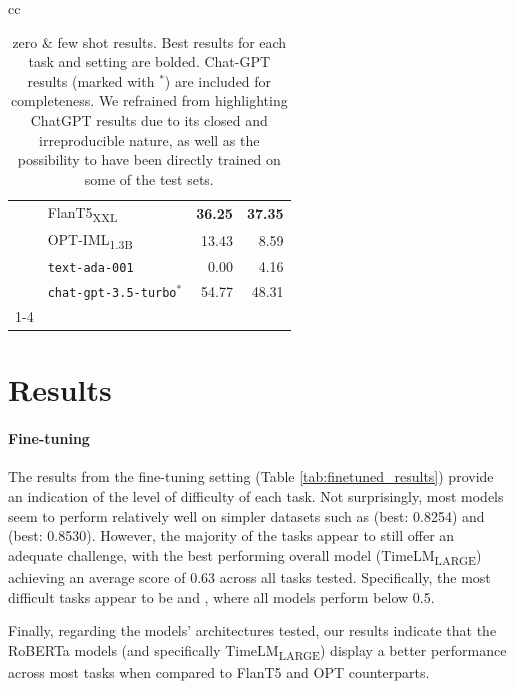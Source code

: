 \begin{table}[t]
\begin{tabular}{cc}
\begin{minipage}{.5\linewidth}
{\begin{tabular}{llrr}
         & FlanT5\textsubscript{XXL} & \textbf{36.25} & \textbf{37.35} \\
         & OPT-IML\textsubscript{1.3B} & 13.43 & 8.59 \\
         & \texttt{text-ada-001} & 0.00 & 4.16 \\
         & \texttt{chat-gpt-3.5-turbo$^*$} & 54.77 & 48.31 \\
        \cmidrule{1-4}
        \end{tabular}}
    \end{minipage} 
\end{tabular}
\caption{{\DATASET} zero \& few shot results. Best results for each task and setting are bolded. Chat-GPT results (marked with $^*$) are included for completeness. We refrained from highlighting ChatGPT results due to its closed and irreproducible nature, as well as the possibility to have been directly trained on some of the test sets.}
\label{tab:zerofew_results}
\end{table}

\section{Results}

\paragraph{Fine-tuning}

The results from the fine-tuning setting  (Table \ref{tab:finetuned_results}) provide an indication of the level of difficulty of each task. Not surprisingly, most models seem to perform relatively well on simpler datasets such as {\TweetHate} (best: 0.8254) and {\TweetNERD} (best: 0.8530). However, the majority of the tasks appear to still offer an adequate challenge, with the best performing overall model (TimeLM\textsubscript{LARGE}) achieving an average score of 0.63 across all tasks tested. Specifically, the most difficult tasks appear to be {\TweetEmoji} and {\TweetQG}, where all models perform below 0.5.

Finally, regarding the models' architectures tested, our results indicate that the RoBERTa models (and specifically TimeLM\textsubscript{LARGE}) display a better performance across most tasks when compared to FlanT5 and OPT counterparts.


